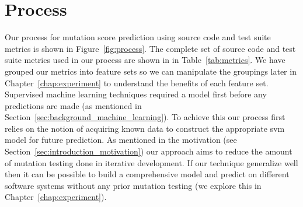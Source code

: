 \section{Process}
\label{sec:approach_process}
Our process for mutation score prediction using source code and test suite metrics is shown in Figure~\ref{fig:process}. The complete set of source code and test suite metrics used in our process are shown in in Table~\ref{tab:metrics}. We have grouped our metrics into feature sets so we can manipulate the groupings later in Chapter~\ref{chap:experiment} to understand the benefits of each feature set. Supervised machine learning techniques required a model first before any predictions are made (as mentioned in Section~\ref{sec:background_machine_learning}). To achieve this our process first relies on the notion of acquiring known data to construct the appropriate \gls{svm} model for future prediction. As mentioned in the motivation (see Section~\ref{sec:introduction_motivation}) our approach aims to reduce the amount of mutation testing done in iterative development. If our technique generalize well then it can be possible to build a comprehensive model and predict on different software systems without any prior mutation testing (we explore this in Chapter~\ref{chap:experiment}).

